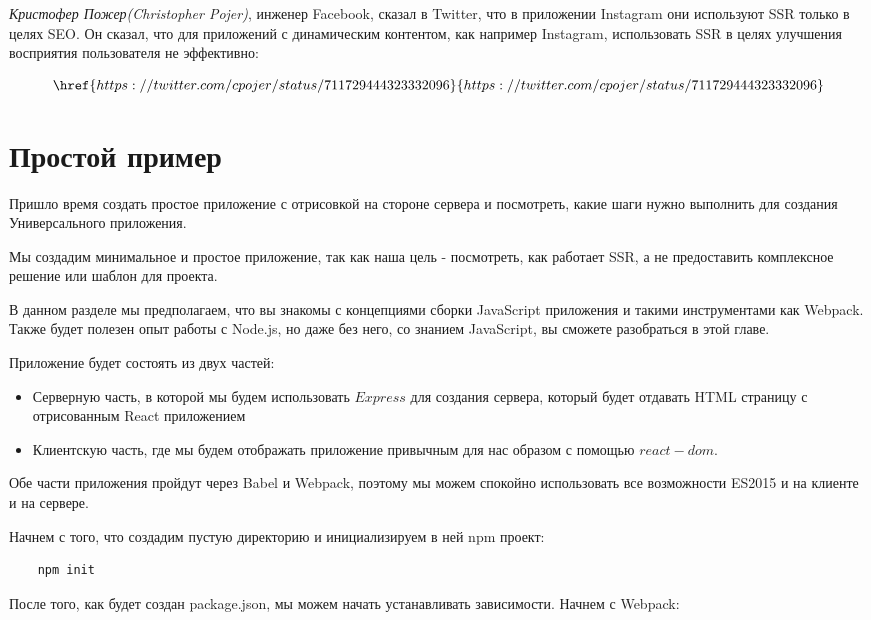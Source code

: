 \textit{Кристофер Пожер(Christopher Pojer)}, инженер Facebook, сказал в Twitter, что в приложении Instagram они используют SSR только в целях SEO. Он сказал, что для приложений с динамическим контентом, как например Instagram, использовать SSR в целях улучшения восприятия пользователя не эффективно:

$$
\href{https://twitter.com/cpojer/status/711729444323332096}{https://twitter.com/cpojer/status/711729444323332096}
$$

\section{Простой пример}

Пришло время создать простое приложение с отрисовкой на стороне сервера и посмотреть, какие шаги нужно выполнить для создания Универсального приложения.

Мы создадим минимальное и простое приложение, так как наша цель - посмотреть, как работает SSR, а не предоставить комплексное решение или шаблон для проекта.

В данном разделе мы предполагаем, что вы знакомы с концепциями сборки JavaScript приложения и такими инструментами как Webpack. Также будет полезен опыт работы с Node.js, но даже без него, со знанием JavaScript, вы сможете разобраться в этой главе.

Приложение будет состоять из двух частей:

\begin{itemize}
	\item Серверную часть, в которой мы будем использовать $Express$ для создания сервера, который будет отдавать HTML страницу с отрисованным React приложением
	\item Клиентскую часть, где мы будем отображать приложение привычным для нас образом с помощью $react-dom$.
\end{itemize}

Обе части приложения пройдут через Babel и Webpack, поэтому мы можем спокойно использовать все возможности ES2015 и на клиенте и на сервере.

Начнем с того, что создадим пустую директорию и инициализируем в ней npm проект:

\begin{lstlisting}
	npm init
\end{lstlisting}

После того, как будет создан package.json, мы можем начать устанавливать зависимости. Начнем с Webpack:

